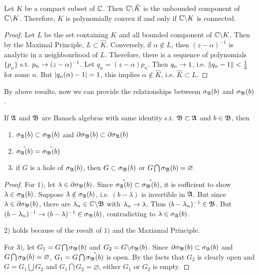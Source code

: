 \documentclass[a4paper,11pt]{report}
\begin{document}
\begin{prop}
	Let $K$ be a compact subset of $\mathbb{C}$. Then $\mathbb{C} \backslash \hat{K}$ is the unbounded component of $\mathbb{C} \backslash K$. Therefore, $K$ is polynomially convex if and only if $\mathbb{C} \backslash K$ is connected.
\end{prop}
\begin{proof}
	Let $L$ be the set containing $K$ and all bounded component of $\mathbb{C} \backslash K$. Then by the Maximal Principle, $L \subset \hat{K}$. Conversely, if $\alpha \notin L$, then $(z-\alpha)^{-1}$ is analytic in a neighbourhood of $L$. Therefore, there is a sequence of polynomials $\{p_n\}$ s.t. $p_n \rightarrow (z-\alpha)^{-1}$. Let $q_n=(z-\alpha)p_n$. Then $q_n \rightarrow 1$, i.e. $\left\lVert q_n-1\right\lVert < \frac{1}{2}$ for some $n$. But $\left\lvert q_n(\alpha)-1\right\lvert=1$, this implies $\alpha \notin \hat{K}$, i.e. $\hat{K} \subset L$.
\end{proof}

By above results, now we can provide the relationships betweem $\sigma_{\mathfrak{A}}(b)$ and $\sigma_{\mathfrak{B}}(b)$.

\begin{thm}
	If $\mathfrak{A}$ and $\mathfrak{B}$ are Banach algebras with same identity s.t. $\mathfrak{B} \subset \mathfrak{A}$ and $b \in \mathfrak{B}$, then
	\begin{enumerate}[label=\arabic*)]
		\item $\sigma_{\mathfrak{A}}(b) \subset \sigma_{\mathfrak{B}}(b)$ and $\partial\sigma_{\mathfrak{B}}(b) \subset \partial\sigma_{\mathfrak{A}}(b)$
		\item $\hat{\sigma_{\mathfrak{A}}(b)} = \hat{\sigma_{\mathfrak{B}}(b)}$
		\item if $G$ is a hole of $\sigma_{\mathfrak{A}}(b)$, then $G \subset \sigma_{\mathfrak{B}}(b)$ or $G \bigcap \sigma_{\mathfrak{B}}(b) = \varnothing$
	\end{enumerate}
\end{thm}
\begin{proof}
	\item For $1)$, let $\lambda \in \partial\sigma_{\mathfrak{B}}(b)$. Since $\mathring{\sigma_{\mathfrak{A}}(b)} \subset \mathring{\sigma_{\mathfrak{B}}(b)}$, it is sufficient to show $\lambda \in \sigma_{\mathfrak{A}}(b)$. Suppose $\lambda \notin \sigma_{\mathfrak{A}}(b)$, i.e. $(b-\lambda)$ is invertible in $\mathfrak{A}$. But since $\lambda \in \partial\sigma_{\mathfrak{B}}(b)$, there are $\lambda_n \in \mathbb{C} \backslash \mathfrak{B}$ with $\lambda_n \rightarrow \lambda$. Thus $(b-\lambda_n)^{-1} \in \mathfrak{B}$. But $(b-\lambda_n)^{-1} \rightarrow (b-\lambda)^{-1} \in \sigma_{\mathfrak{B}}(b)$, contradicting to $\lambda \in \sigma_{\mathfrak{A}}(b)$.
	\item $2)$ holds because of the result of $1)$ and the Maxiamal Principle.
	\item For $3)$, let $G_1 = G \bigcap \sigma_{\mathfrak{B}}(b)$ and $G_2 = G \backslash \sigma_{\mathfrak{B}}(b)$. Since $\partial\sigma_{\mathfrak{B}}(b) \subset \sigma_{\mathfrak{A}}(b)$ and $G \bigcap \sigma_{\mathfrak{A}}(b) = \varnothing$, $G_1 = G \bigcap \mathring{\sigma_{\mathfrak{B}}(b)}$ is open. By the facts that $G_2$ is clearly open and $G = G_1 \bigcup G_2$ and $G_1 \bigcap G_2 = \varnothing$, either $G_1$ or $G_2$ is empty.
\end{proof}
\end{document}
